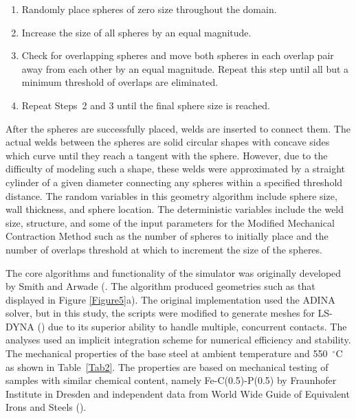 \documentclass[review]{elsarticle}
\begin{document}
\begin{enumerate}
	\item Randomly place spheres of zero size throughout the domain.
	\item Increase the size of all spheres by an equal magnitude.
	\item Check for overlapping spheres and move both spheres in each overlap pair away from each other by an equal magnitude. Repeat this step until all but a minimum threshold of overlaps are eliminated.
	\item Repeat Steps~2 and 3 until the final sphere size is reached.
\end{enumerate}

After the spheres are successfully placed, welds are inserted to connect them. The actual welds between the spheres are solid circular shapes with concave sides which curve until they reach a tangent with the sphere. However, due to the difficulty of modeling such a shape, these welds were approximated by a straight cylinder of a given diameter connecting any spheres within a specified threshold distance. The random variables in this geometry algorithm include sphere size, wall thickness, and sphere location. The deterministic variables include the weld size, structure, and some of the input parameters for the Modified Mechanical Contraction Method such as the number of spheres to initially place and the number of overlaps threshold at which to increment the size of the spheres.

The core algorithms and functionality of the simulator was originally developed by Smith and Arwade (\cite{Smith2012,smith_characterization_2012}. The algorithm produced geometries such as that displayed in Figure \ref{Figure5}a). The original implementation used the ADINA solver, but in this study, the scripts were modified to generate meshes for LS-DYNA (\cite{hallquist_ls-dyna_2006}) due to its superior ability to handle multiple, concurrent contacts. The analyses used an implicit integration scheme for numerical efficiency and stability. The mechanical properties of the base steel at ambient temperature and 550~$^{\circ}\mathrm{C}$ as shown in Table~\ref{Tab2}. The properties are based on mechanical testing of samples with similar chemical content, namely Fe-C(0.5)-P(0.5) by Fraunhofer Institute in Dresden and independent data from World Wide Guide of Equivalent Irons and Steels (\cite{cverna_worldwide_2006}).
\end{document}
